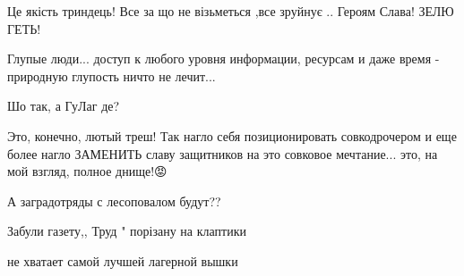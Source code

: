 \begin{itemize}
Це якість триндець!
Все за що не візьметься ,все
зруйнує ..
Героям Слава! ЗЕЛЮ ГЕТЬ!

 
Глупые люди... доступ к любого уровня информации, ресурсам и даже время - природную глупость ничто не лечит...

 
Шо так, а ГуЛаг де?

 

Это, конечно, лютый треш! Так нагло себя позиционировать совкодрочером и еще
более нагло ЗАМЕНИТЬ славу защитников на это совковое мечтание... это, на мой
взгляд, полное днище!😡


 
А заградотряды с лесоповалом будут??

 
Забули газету,, Труд " порізану на клаптики

 
не хватает самой лучшей лагерной вышки


\end{itemize}
